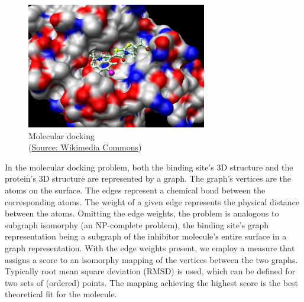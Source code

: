 \begin{figure}[H]
    \centering
    \includegraphics[width=0.7\textwidth]{figures/bioinformatics/molecular_docking.jpg}
    \caption{Molecular docking \\(\href{https://commons.wikimedia.org/wiki/File:Docking.jpg}{Source: Wikimedia Commons})}
\end{figure}

In the molecular docking problem, both the binding site's 3D structure and the protein's 3D structure are represented by a graph. The graph's vertices are the atoms on the surface. The edges represent a chemical bond between the corresponding atoms. The weight of a given edge represents the physical distance between the atoms. Omitting the edge weights, the problem is analogous to subgraph isomorphy (an NP-complete problem), the binding site's graph representation being a subgraph of the inhibitor molecule's entire surface in a graph representation. With the edge weights present, we employ a measure that assigns a score to an isomorphy mapping of the vertices between the two graphs. Typically root mean square deviation (RMSD) is used, which can be defined for two sets of (ordered) points. The mapping achieving the highest score is the best theoretical fit for the molecule.
 \cite{wang_protein_2021}
